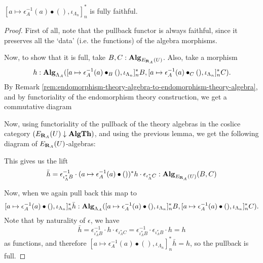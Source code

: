 \begin{lemma}\label{lem:pullback-fully-faithful}
  $ [a \mapsto \epsilon_A^{-1}(a) \bullet (), \iota_{\Lambda_n}]_n^* $ is fully faithful.
\end{lemma}
\begin{proof}
  First of all, note that the pullback functor is always faithful, since it preserves all the `data' (i.e. the functions) of the algebra morphisms.

  Now, to show that it is full, take $ B, C: \mathbf{Alg}_{E_{\mathbf{R}_A}(U)} $. Also, take a morphism
  \[ h : \mathbf{Alg}_{\Lambda_A}([a \mapsto \epsilon_A^{-1}(a) \bullet_B (), \iota_{\Lambda_n}]_n^* B, [a \mapsto \epsilon_A^{-1}(a) \bullet_C (), \iota_{\Lambda_n}]_n^* C). \]
  By Remark \ref{rem:endomorphism-theory-algebra-to-endomorphism-theory-algebra}, and by functoriality of the endomorphism theory construction, we get a commutative diagram
  \begin{center}
  \end{center}
  Now, using functoriality of the pullback of the theory algebras in the coslice category $ (E_{\mathbf{R}_A}(U) \downarrow \mathbf{AlgTh}) $, and using the previous lemma, we get the following diagram of $ E_{\mathbf{R}_A}(U) $-algebras:
  \begin{center}
  \end{center}
  This gives us the lift
  \[ \bar h = \epsilon_{\iota_\Lambda^* B}^{-1} \cdot (a \mapsto \epsilon_A^{-1}(a) \bullet ())^* h \cdot \epsilon_{\iota_\Lambda^* C} : \mathbf{Alg}_{E_{\mathbf{R}_A}(U)}(B, C) \]

  Now, when we again pull back this map to
  \[ [a \mapsto \epsilon_A^{-1}(a) \bullet (), \iota_{\Lambda_n}]_n^* \bar h : \mathbf{Alg}_{\Lambda_A}([a \mapsto \epsilon_A^{-1}(a) \bullet (), \iota_{\Lambda_n}]_n^* B, [a \mapsto \epsilon_A^{-1}(a) \bullet (), \iota_{\Lambda_n}]_n^* C). \]
  Note that by naturality of $ \epsilon $, we have
  \[ \bar h = \epsilon_{\iota_\Lambda^* B}^{-1} \cdot h \cdot \epsilon_{\iota_\Lambda^* C} = \epsilon_{\iota_\Lambda^* B}^{-1} \cdot \epsilon_{\iota_\Lambda^* B} \cdot h = h \]
  as functions, and therefore $ [a \mapsto \epsilon_A^{-1}(a) \bullet (), \iota_{\Lambda_n}]_n^* \bar h = h $, so the pullback is full.
\end{proof}

